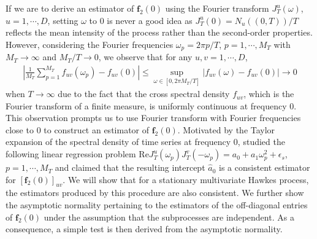 \documentclass[11pt]{article}
\numberwithin{equation}{section}
\theoremstyle{plain}
\theoremstyle{definition}
\theoremstyle{definition}
\theoremstyle{assumption}
\theoremstyle{proposition}
\theoremstyle{proposition}
\theoremstyle{example}
\theoremstyle{lemma}
\theoremstyle{theorem}
\theoremstyle{remark}
\begin{document}
If we are to derive an estimator of $\boldsymbol{f}_2(0)$ using the Fourier transform $J_T^{u}(\omega)$, $u=1,\cdots,D$, setting $\omega$ to $0$ is never a good idea as $J_T^{u}(0) = N_{u}((0,T))/T$ reflects the mean intensity of the process rather than the second-order properties. However, considering the Fourier frequencies $\omega_p = 2\pi p/T$, $p=1,\cdots,M_T$ with $M_T\rightarrow\infty$ and $M_T/T\rightarrow0$, we observe that for any $u,v=1,\cdots,D$,
\begin{align*}
\left|\frac{1}{M_T}\sum_{p=1}^{M_T} f_{uv}(\omega_p) - f_{uv}(0) \right|
\leqslant \sup_{\omega\in[0,2\pi M_T/T]}|f_{uv}(\omega) - f_{uv}(0)|\rightarrow 0
\end{align*}
when $T\rightarrow\infty$ due to the fact that the cross spectral density $f_{uv}$, which is the Fourier transform of a finite measure, is uniformly continuous at frequency 0. This observation prompts us to use Fourier transform with Fourier frequencies close to $0$ to construct an estimator of $\boldsymbol{f}_2(0)$. Motivated by the Taylor expansion of the spectral density of time series at frequency 0, \citet{McElroy_and_Politis2025} studied the following linear regression problem $\mathrm{Re}J_{T}^{u}(\omega_p)J_{T}^{v}(-\omega_p) = a_0 + a_1 \omega_p^2 + \epsilon_s$, $p=1,\cdots,M_T$ and claimed that the resulting intercept $\hat{a}_0$ is a consistent estimator for $[\boldsymbol f_2(0)]_{uv}$. We will show that for a stationary multivariate Hawkes process, the estimators produced by this procedure are also consistent. We further show the asymptotic normality pertaining to the estimators of the off-diagonal entries of $\boldsymbol{f}_2(0)$ under the assumption that the subprocesses are independent. As a consequence, a simple test is then derived from the asymptotic normality.
\end{document}
